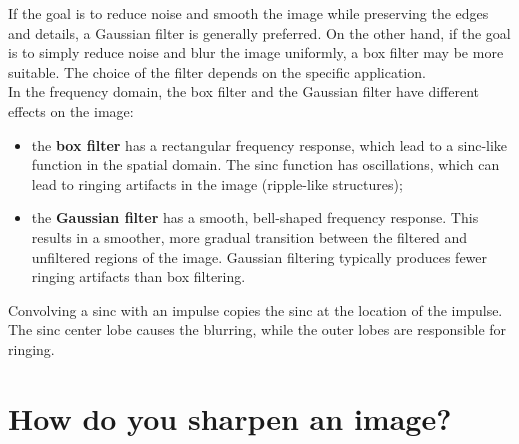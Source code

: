 \documentclass{article}
\begin{document}
If the goal is to reduce noise and smooth the image while preserving the edges and details, a Gaussian filter is generally preferred. On the other hand, if the goal is to simply reduce noise and blur the image uniformly, a box filter may be more suitable. The choice of the filter depends on the specific application. \\

In the frequency domain, the box filter and the Gaussian filter have different effects on the image:
\begin{itemize}
    \item the \textbf{box filter} has a rectangular frequency response, which lead to a sinc-like function in the spatial domain. The sinc function has oscillations, which can lead to ringing artifacts in the image (ripple-like structures);
    \item the \textbf{Gaussian filter} has a smooth, bell-shaped frequency response. This results in a smoother, more gradual transition between the filtered and unfiltered regions of the image. Gaussian filtering typically produces fewer ringing artifacts than box filtering.
\end{itemize}

Convolving a sinc with an impulse copies the sinc at the location of the impulse. The sinc center lobe causes the blurring, while the outer lobes are responsible for ringing.

\hspace{0.5cm}

\begin{center}
    
    
\end{center}

\newpage

\section*{How do you sharpen an image?}
\end{document}
